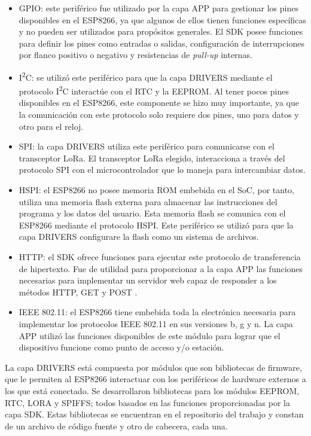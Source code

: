 \begin{itemize}
	\item GPIO: este periférico fue utilizado por la capa APP para gestionar los pines disponibles en el ESP8266, ya que algunos de ellos tienen funciones específicas y no pueden ser utilizados para propósitos generales. El SDK posee funciones para definir los pines como entradas o salidas, configuración de interrupciones por flanco positivo o negativo y resistencias de \textit{pull-up} internas.
	\item I\textsuperscript{2}C: se utilizó este periférico para que la capa DRIVERS mediante el protocolo I\textsuperscript{2}C interactúe con el RTC y la EEPROM. Al tener pocos pines disponibles en el ESP8266, este componente se hizo muy importante, ya que la comunicación con este protocolo solo requiere dos pines, uno para datos y otro para el reloj.
	\item SPI: la capa DRIVERS utiliza este periférico para comunicarse con el transceptor LoRa. El transceptor LoRa elegido, interacciona a través del protocolo SPI con el microcontrolador que lo maneja para intercambiar datos.
	\item HSPI: el ESP8266 no posee memoria ROM embebida en el SoC, por tanto, utiliza una memoria flash externa para almacenar las instrucciones del programa y los datos del usuario. Esta memoria flash se comunica con el ESP8266 mediante el protocolo HSPI. Este periférico se utilizó para que la capa DRIVERS configurare la flash como un sistema de archivos.
	\item HTTP: el SDK ofrece funciones para ejecutar este protocolo de transferencia de hipertexto. Fue de utilidad para proporcionar a la capa APP las funciones necesarias para implementar un servidor web capaz de responder a los métodos HTTP, GET y POST \citep{WEBSITE:20}.
	\item IEEE 802.11: el ESP8266 tiene embebida toda la electrónica necesaria para implementar los protocolos IEEE 802.11 en sus versiones b, g y n. La capa APP utilizó las funciones disponibles de este módulo para lograr que el dispositivo funcione como punto de acceso y/o estación.
\end{itemize}

La capa DRIVERS está compuesta por módulos que son bibliotecas de firmware, que le permiten al ESP8266 interactuar con los periféricos de hardware externos a los que está conectado. Se desarrollaron bibliotecas para los módulos EEPROM, RTC, LORA y SPIFFS; todos basados en las funciones proporcionadas por la capa SDK. Estas bibliotecas se encuentran en el repositorio del trabajo y constan de un archivo de código fuente y otro de cabecera, cada una.

